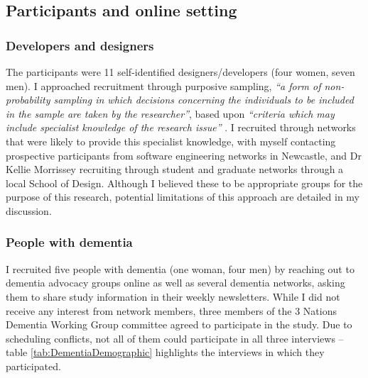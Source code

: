 \subsection{Participants and online setting}
\subsubsection{Developers and designers}
The participants were 11 self-identified designers/developers (four women, seven men). I approached recruitment through purposive sampling, \textit{``a form of non-probability sampling in which decisions concerning the individuals to be included in the sample are taken by the researcher''}, based upon \textit{``criteria which may include specialist knowledge of the research issue''} \citep[p.5]{rai2015study}. I recruited through networks that were likely to provide this specialist knowledge, with myself contacting prospective participants from software engineering networks in Newcastle, and Dr Kellie Morrissey recruiting through student and graduate networks through a local School of Design. Although I believed these to be appropriate groups for the purpose of this research, potential limitations of this approach are detailed in my discussion. 

\subsubsection{People with dementia}
I recruited five people with dementia (one woman, four men) by reaching out to dementia advocacy groups online as well as several dementia networks, asking them to share study information in their weekly newsletters. While I did not receive any interest from network members, three members of the 3 Nations Dementia Working Group committee agreed to participate in the study. Due to scheduling conflicts, not all of them could participate in all three interviews – table \ref{tab:DementiaDemographic} highlights the interviews in which they participated.   

